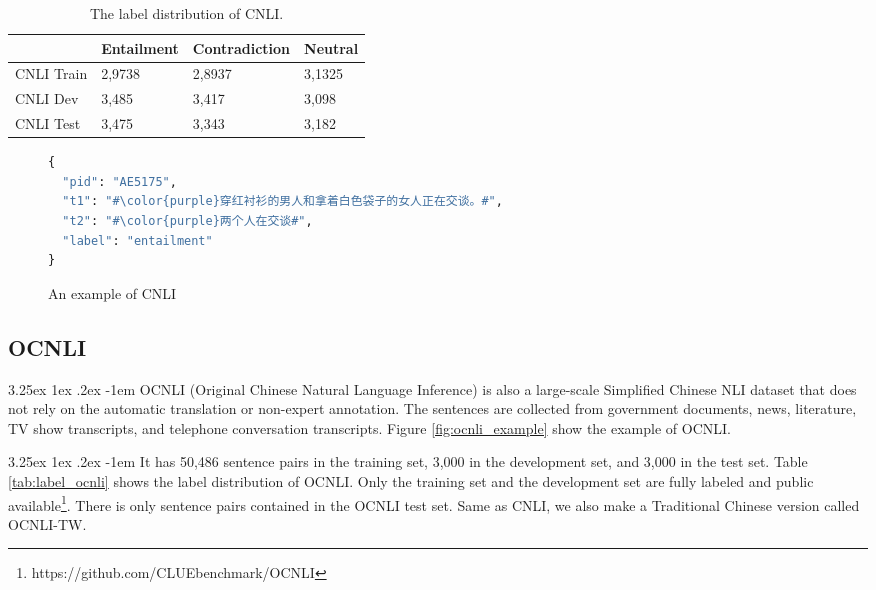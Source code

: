 \documentclass[12pt]{article}
\makeatletter
\renewcommand\paragraph{\@startsection{paragraph}{5}{\z@}%
  {3.25ex \@plus1ex \@minus.2ex}%
  {-1em}%
  {\normalfont\normalsize\bfseries}}
\makeatother
\begin{document}
\begin{CJK*}{UTF8}{bkai}
\begin{spacing}{1.77}
\begin{table}[H]
  \centering
  \setlength{\extrarowheight}{-3pt}
  \begin{tabular}{|l|R{3cm}|R{3cm}|R{3cm}|}
  \hline
             & Entailment & Contradiction & Neutral \\ \hline
  CNLI Train & 2,9738     & 2,8937        & 3,1325  \\ \hline
  CNLI Dev   & 3,485      & 3,417         & 3,098   \\ \hline
  CNLI Test  & 3,475      & 3,343         & 3,182   \\ \hline
  \end{tabular}
  \caption{The label distribution of CNLI.}
  \label{tab:label_cnli}
\end{table}

\begin{figure}
\caption{An example of CNLI}
\begin{CJK*}{UTF8}{gbsn}
\begin{lstlisting}[language=Python, escapechar=\#]
{
  "pid": "AE5175",
  "t1": "#\color{purple}穿红衬衫的男人和拿着白色袋子的女人正在交谈。#",
  "t2": "#\color{purple}两个人在交谈#",
  "label": "entailment"
}
\end{lstlisting}
\end{CJK*}
\label{fig:cnli_example}
\end{figure}

\subsection{OCNLI}
\paragraph{}
OCNLI (Original Chinese Natural Language Inference) is also a large-scale Simplified Chinese NLI dataset that does not rely on the automatic translation or non-expert annotation. The sentences are collected from government documents, news, literature, TV show
transcripts, and telephone conversation transcripts. Figure \ref{fig:ocnli_example} show the example of OCNLI.

\paragraph{}
It has 50,486 sentence pairs in the training set, 3,000 in the development set, and 3,000 in the test set. Table \ref{tab:label_ocnli} shows the label distribution of OCNLI. Only the training set and the development set are fully labeled and public available\footnote{https://github.com/CLUEbenchmark/OCNLI}. There is only sentence pairs contained in the OCNLI test set. Same as CNLI, we also make a Traditional Chinese version called OCNLI-TW.


\end{spacing}
\end{CJK*}
\end{document}
